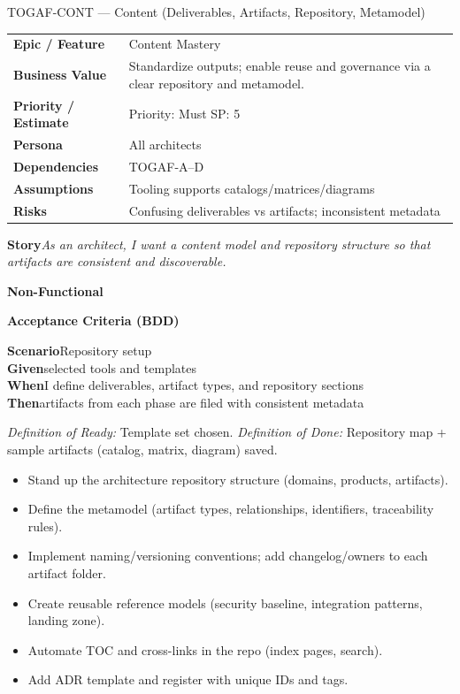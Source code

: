 \documentclass[11pt,a4paper]{article}
\newcommand{\Tag}[1]{%
  \tcbox[
    on line, rounded corners,
    colback=chipback, colframe=chipborder,
    boxrule=0.3pt, left=5pt, right=5pt, top=2pt, bottom=2pt]{\footnotesize #1}%
}
\newlength{\StoryLabelWidth}
\newlength{\StoryValueWidth}
\newcommand{\Field}[2]{\textbf{#1} & #2\\}
\newcommand{\StoryText}[1]{\textbf{Story}\quad \textit{#1}}
\newcommand{\NonFunctional}[1]{\textbf{Non-Functional}\quad #1}
\newcommand{\BDDHeader}{\textbf{Acceptance Criteria (BDD)}}
\newcommand{\BDDRow}[2]{\textbf{#1}\quad #2}
\newcommand{\DOR}[1]{\textit{\footnotesize Definition of Ready:} #1}
\newcommand{\DOD}[1]{\textit{\footnotesize Definition of Done:} #1}
\newcommand{\Task}[1]{\item[$\square$] #1}
\providecommand{\Field}[2]{\textbf{#1} & #2\\}
\begin{document}
\clearpage

\begin{StoryCard}{TOGAF-CONT — Content (Deliverables, Artifacts, Repository, Metamodel)}
\par\setlength{\StoryLabelWidth}{0.27\linewidth}%
\setlength{\StoryValueWidth}{\dimexpr\linewidth-\StoryLabelWidth-2\tabcolsep-10pt\relax}%
\noindent\begin{tabular}{@{}>{\RaggedRight\arraybackslash\bfseries}p{\StoryLabelWidth}>{\RaggedRight\arraybackslash}p{\StoryValueWidth}@{}}
  \Field{Epic / Feature}{Content Mastery}
  \Field{Business Value}{Standardize outputs; enable reuse and governance via a clear repository and metamodel.}
  \Field{Priority / Estimate}{Priority: Must \quad\quad SP: 5}
  \Field{Persona}{All architects}
  \Field{Dependencies}{TOGAF-A–D}
  \Field{Assumptions}{Tooling supports catalogs/matrices/diagrams}
  \Field{Risks}{Confusing deliverables vs artifacts; inconsistent metadata}
\end{tabular}\par

\vspace{4pt}
\StoryText{As an architect, I want a content model and repository structure so that artifacts are consistent and discoverable.}

\vspace{2pt}
\NonFunctional{\Tag{Findability} \Tag{Consistency} \Tag{Reuse}}

\vspace{6pt}
\BDDHeader

\BDDRow{Scenario}{Repository setup}\\
\BDDRow{Given}{selected tools and templates}\\
\BDDRow{When}{I define deliverables, artifact types, and repository sections}\\
\BDDRow{Then}{artifacts from each phase are filed with consistent metadata}

\vspace{6pt}
\DOR{Template set chosen.}\quad
\DOD{Repository map + sample artifacts (catalog, matrix, diagram) saved.}
\end{StoryCard}
\begin{TasksBox}
\begin{itemize}[label={}, leftmargin=*]
\Task{Stand up the architecture repository structure (domains, products, artifacts).}
\Task{Define the metamodel (artifact types, relationships, identifiers, traceability rules).}
\Task{Implement naming/versioning conventions; add changelog/owners to each artifact folder.}
\Task{Create reusable reference models (security baseline, integration patterns, landing zone).}
\Task{Automate TOC and cross-links in the repo (index pages, search).}
\Task{Add ADR template and register with unique IDs and tags.}
\end{itemize}
\end{TasksBox}
\end{document}
